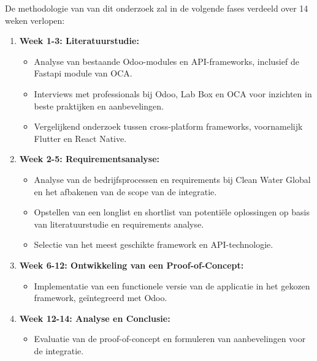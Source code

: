 


De methodologie van van dit onderzoek zal in de volgende fases verdeeld over 14 weken verlopen:

\begin{enumerate}
    \item \textbf{Week 1-3: Literatuurstudie:}
    \begin{itemize}
        \item Analyse van bestaande Odoo-modules en API-frameworks, inclusief de Fastapi module van OCA.
        \item Interviews met professionals bij Odoo, Lab Box en OCA voor inzichten in beste praktijken en aanbevelingen.
        \item Vergelijkend onderzoek tussen cross-platform frameworks, voornamelijk Flutter en React Native.
    \end{itemize}
    
    \item \textbf{Week 2-5: Requirementsanalyse:}
    \begin{itemize}
        \item Analyse van de bedrijfsprocessen en requirements bij Clean Water Global en het afbakenen van de scope van de integratie. 
        \item Opstellen van een longlist en shortlist van potentiële oplossingen op basis van literatuurstudie en requirements analyse.
        \item Selectie van het meest geschikte framework en API-technologie.
    \end{itemize}

    \item \textbf{Week 6-12: Ontwikkeling van een Proof-of-Concept:}
    \begin{itemize}
        \item Implementatie van een functionele versie van de applicatie in het gekozen framework, geïntegreerd met Odoo.
    \end{itemize}

    \item \textbf{Week 12-14: Analyse en Conclusie:}
    \begin{itemize}
        \item Evaluatie van de proof-of-concept en formuleren van aanbevelingen voor de integratie.
    \end{itemize}
\end{enumerate}

